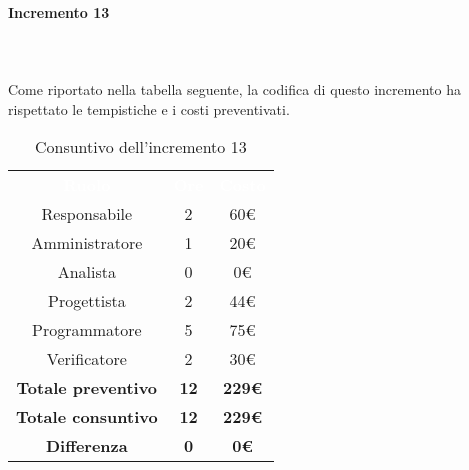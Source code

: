 \paragraph*{Incremento 13} \mbox{} \\ \mbox{} \\
Come riportato nella tabella seguente, la codifica di questo incremento ha rispettato le tempistiche e i costi preventivati.
\begin{table}[H]
\centering\renewcommand{\arraystretch}{1.5}
\caption{Consuntivo dell'incremento 13}
\vspace{0.2cm}
\begin{tabular}{ c c c }
\rowcolor{redafk}
\textcolor{white}{\textbf{Ruolo}} & \textcolor{white}{\textbf{Ore}} &
\textcolor{white}{\textbf{Costo}}  \\
Responsabile 	& 2 & 60€ \\
Amministratore 	& 1  & 20€ \\
Analista 		&  0 & 0€ \\
Progettista		&  2 & 44€ \\
Programmatore	&  5 & 75€ \\
Verificatore 	& 2 & 30€ \\
\textbf{Totale preventivo} & \textbf{12}& \textbf{229€} \\
\textbf{Totale consuntivo} & \textbf{12} & \textbf{229€}  \\
\rowcolor{lastrowcolor}
\textbf{Differenza} & \textbf{0} & \textbf{0€} \\
\end{tabular}
\end{table}

